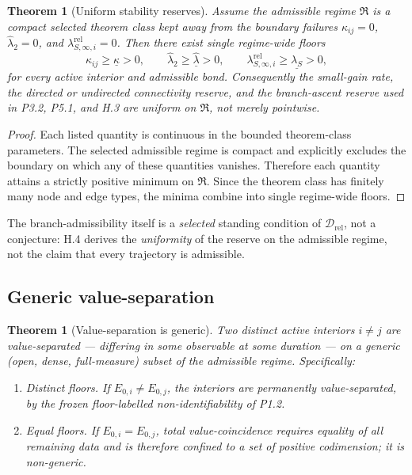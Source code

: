\documentclass[11pt,a4paper]{article}
\theoremstyle{definition}
\theoremstyle{plain}
\newtheorem{theorem}[definition]{Theorem}
\theoremstyle{remark}
\begin{document}
\begin{theorem}[Uniform stability reserves]\label{thm:unifconst}
Assume the admissible regime \(\mathfrak R\) is a compact selected theorem class kept away
from the boundary failures \(\kappa_{ij}=0\), \(\widehat\lambda_2=0\), and
\(\lambda_{S,\infty,i}^{\mathrm{rel}}=0\). Then there exist single regime-wide floors
\[
\boxed{\;
\kappa_{ij}\ge\underline\kappa>0,
\qquad
\widehat\lambda_2\ge\underline{\widehat\lambda}>0,
\qquad
\lambda_{S,\infty,i}^{\mathrm{rel}}\ge\underline{\lambda_S}>0,
\;}
\]
for every active interior and admissible bond. Consequently the small-gain rate, the directed
or undirected connectivity reserve, and the branch-ascent reserve used in P3.2, P5.1, and H.3
are uniform on \(\mathfrak R\), not merely pointwise.
\end{theorem}

\begin{proof}
Each listed quantity is continuous in the bounded theorem-class parameters. The selected
admissible regime is compact and explicitly excludes the boundary on which any of these
quantities vanishes. Therefore each quantity attains a strictly positive minimum on
\(\mathfrak R\). Since the theorem class has finitely many node and edge types, the minima
combine into single regime-wide floors. \qedhere
\end{proof}

\noindent The branch-admissibility itself is a \emph{selected} standing condition of
\(\mathcal D_{\mathrm{rel}}\), not a conjecture: H.4 derives the \emph{uniformity} of the
reserve on the admissible regime, not the claim that every trajectory is admissible.

\subsection{Generic value-separation}

\begin{theorem}[Value-separation is generic]\label{thm:valuesep}
Two distinct active interiors \(i\neq j\) are value-separated --- differing in some observable
at some duration --- on a generic (open, dense, full-measure) subset of the admissible regime.
Specifically:
\begin{enumerate}[label=\textup{(\alph*)},leftmargin=1.2cm]
\item \emph{Distinct floors.} If \(E_{0,i}\neq E_{0,j}\), the interiors are permanently
value-separated, by the frozen floor-labelled non-identifiability of P1.2.
\item \emph{Equal floors.} If \(E_{0,i}=E_{0,j}\), total value-coincidence requires equality
of all remaining data and is therefore confined to a set of positive codimension; it is
non-generic.
\end{enumerate}
\end{theorem}
\end{document}
